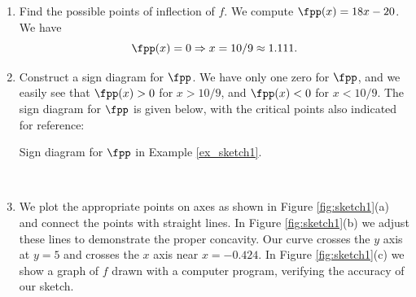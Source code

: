 {\begin{enumerate}
From the sign diagram, we see that $f$ is increasing on $(-\infty,c_1)\cup (c_2,\infty)$ (where $\fp(x)>0$, and $f$ is decreasing on $(c_1,c_2)$ (where $\fp(x)<0$).

Since $\fp$ changes from positive to negative at $c_1$, we know that $(c_1,f(c_1))$ is a local maximum, and since $\fp$ changes from negative to positive at $c_2$, we know that $(c_2,f(c_2))$ is a local minimum.

\item		Find the possible points of inflection of $f$. We compute $\fpp(x) = 18x-20$. We have 
\[
\fpp(x) = 0 \Rightarrow x= 10/9 \approx 1.111.
\]
\item		Construct a sign diagram for $\fpp$.
We have only one zero for $\fpp$, and we easily see that $\fpp(x)>0$ for $x>10/9$, and $\fpp(x)<0$ for $x<10/9$. The sign diagram for $\fpp$ is given below, with the critical points also indicated for reference:

\noindent\begin{minipage}{\textwidth}
\begin{center}
\end{center}
\captionsetup{type=figure}%
			\caption{Sign diagram for $\fpp$ in Example \ref{ex_sketch1}.}\label{fig:sketchline1fpp}
\end{minipage}\\


\item		We plot the appropriate points on axes as shown in Figure \ref{fig:sketch1}(a) and connect the points with straight lines. In Figure \ref{fig:sketch1}(b) we adjust these lines to demonstrate the proper concavity. Our curve crosses the $y$ axis at $y=5$ and crosses the $x$ axis near $x=-0.424$. In Figure \ref{fig:sketch1}(c) we show a graph of $f$ drawn with a computer program, verifying the accuracy of our sketch.
\end{enumerate}

}
